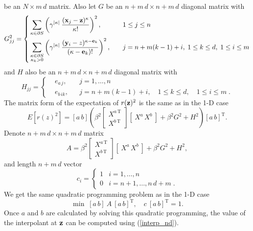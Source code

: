 be an $N \times m\,d$ matrix.
Also let $G$ be an $n+m\,d \times n+m\,d$ diagonal matrix with
\[ G^2_{jj} = \left\{ \begin{aligned}
      & \sum_{\kappa\in \partial S} \left( \gamma^{|\kappa|} \:
        \frac{(\mathbf{x}_j - \mathbf{z})^\kappa}{\kappa!} \right)^2, && 1\le j\le n \\
      & \sum_{\substack{\kappa\in \partial S\\ \kappa_k>0}}
        \left( \gamma^{|\kappa|}\:
        \frac{(\mathbf{y}_{i} - z)^{\kappa-\mathbf{e}_k}}{(\kappa-\mathbf{e}_k)!} \right)^2, \quad
        && j=n+m(k-1)+i,\; 1\le k\le d,\; 1\le i\le m
\end{aligned} \right.\]
and $H$ also be an $n+m\,d \times n+m\,d$ diagonal matrix with
\[ H_{jj} = \left\{ \begin{aligned}
      & e_{a\,j}, && j=1,\ldots,n \\
      & e_{b\,ik}, && j=n+m(k-1)+i,\quad 1\le k\le d,\quad 1\le i\le m \;.
\end{aligned} \right. \]
The matrix form of the expectation of $r(\mathbf{z})^2$ is the same as in the
1-D case
\[ E\left[r(z)^2\right] = [a\,b] \left( \beta^2
    \left[\begin{array}{c}X^{a\,\mathrm T}\\X^{b\,\mathrm T}\end{array}\right]
    \left[\: X^a\,X^b \:\right] + \beta^2 G^2 + H^2 \right) [a\,b]^{\mathrm T}.
\]
Denote $n+m\,d \times n+m\,d$ matrix
\[ A = \beta^2
   \left[\begin{array}{c}X^{a\,\mathrm T}\\X^{b\,\mathrm T}\end{array}\right]
   \left[\: X^a\,X^b \:\right] + \beta^2 G^2 + H^2 ,\]
and length $n+m\,d$ vector 
\[ c_i = \begin{cases} 1 & i=1,\ldots,n\\ 0 & i=n+1,\ldots,n\,d+m \;.\end{cases}
\]
We get the same quadratic programming problem as in the 1-D case
\begin{equation} \label{quadprog_nd}
\min\; [a\,b]\: A\: [a\,b]^{\mathrm T}, \quad c\: [a\,b]^{\mathrm T} = 1.
\end{equation}
Once $a$ and $b$ are calculated by solving this quadratic programming, the
value of the interpolant at $\mathbf{z}$ can be computed using (\ref{interp_nd}).



